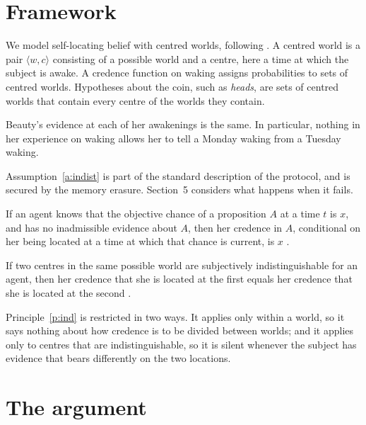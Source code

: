\documentclass{situationist-preprint}
\begin{document}
\section{Framework}

We model self-locating belief with centred worlds, following \citet{Lewis1979}. A centred world is a pair $\langle w, c\rangle$ consisting of a possible world and a centre, here a time at which the subject is awake. A credence function on waking assigns probabilities to sets of centred worlds. Hypotheses about the coin, such as \emph{heads}, are sets of centred worlds that contain every centre of the worlds they contain.

\begin{assumption}[Indistinguishability]\label{a:indist}
Beauty's evidence at each of her awakenings is the same. In particular, nothing in her experience on waking allows her to tell a Monday waking from a Tuesday waking.
\end{assumption}

Assumption~\ref{a:indist} is part of the standard description of the protocol, and is secured by the memory erasure. Section~5 considers what happens when it fails.

\begin{principle}\label{p:pp}
If an agent knows that the objective chance of a proposition $A$ at a time $t$ is $x$, and has no inadmissible evidence about $A$, then her credence in $A$, conditional on her being located at a time at which that chance is current, is $x$ \citep{Lewis1980}.
\end{principle}

\begin{principle}\label{p:ind}
If two centres in the same possible world are subjectively indistinguishable for an agent, then her credence that she is located at the first equals her credence that she is located at the second \citep{Elga2004}.
\end{principle}

Principle~\ref{p:ind} is restricted in two ways. It applies only within a world, so it says nothing about how credence is to be divided between worlds; and it applies only to centres that are indistinguishable, so it is silent whenever the subject has evidence that bears differently on the two locations.

\section{The argument}
\end{document}
